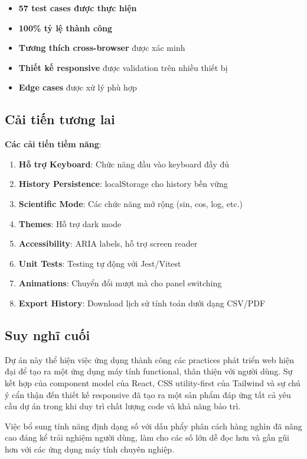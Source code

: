 \begin{itemize}
    \item \textbf{57 test cases được thực hiện}
    \item \textbf{100\% tỷ lệ thành công}
    \item \textbf{Tương thích cross-browser} được xác minh
    \item \textbf{Thiết kế responsive} được validation trên nhiều thiết bị
    \item \textbf{Edge cases} được xử lý phù hợp
\end{itemize}

\subsection{Cải tiến tương lai}

\textbf{Các cải tiến tiềm năng}:
\begin{enumerate}
    \item \textbf{Hỗ trợ Keyboard}: Chức năng đầu vào keyboard đầy đủ
    \item \textbf{History Persistence}: localStorage cho history bền vững
    \item \textbf{Scientific Mode}: Các chức năng mở rộng (sin, cos, log, etc.)
    \item \textbf{Themes}: Hỗ trợ dark mode
    \item \textbf{Accessibility}: ARIA labels, hỗ trợ screen reader
    \item \textbf{Unit Tests}: Testing tự động với Jest/Vitest
    \item \textbf{Animations}: Chuyển đổi mượt mà cho panel switching
    \item \textbf{Export History}: Download lịch sử tính toán dưới dạng CSV/PDF
\end{enumerate}

\subsection{Suy nghĩ cuối}

Dự án này thể hiện việc ứng dụng thành công các practices phát triển web hiện đại để tạo ra một ứng dụng máy tính functional, thân thiện với người dùng. Sự kết hợp của component model của React, CSS utility-first của Tailwind và sự chú ý cẩn thận đến thiết kế responsive đã tạo ra một sản phẩm đáp ứng tất cả yêu cầu dự án trong khi duy trì chất lượng code và khả năng bảo trì.

Việc bổ sung tính năng định dạng số với dấu phẩy phân cách hàng nghìn đã nâng cao đáng kể trải nghiệm người dùng, làm cho các số lớn dễ đọc hơn và gần gũi hơn với các ứng dụng máy tính chuyên nghiệp.

